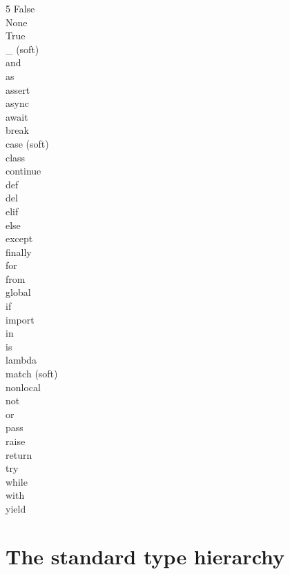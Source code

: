 \documentclass [8pt] {extarticle}
\begin{document}
    \begin {multicols} {5}
        False \\
        None \\
        True \\
        \_ (soft) \\
        and \\
        as \\
        assert \\
        async \\
        await \\
        break \\
        case (soft) \\
        class \\
        continue \\
        def \\
        del \\
        elif \\
        else \\
        except \\
        finally \\
        for \\
        from \\
        global \\
        if \\
        import \\
        in \\
        is \\
        lambda \\
        match (soft) \\
        nonlocal \\
        not \\
        or \\
        pass \\
        raise \\
        return \\
        try \\
        while \\
        with \\
        yield \\
    \end {multicols}

    \section {The standard type hierarchy}
\end{document}
